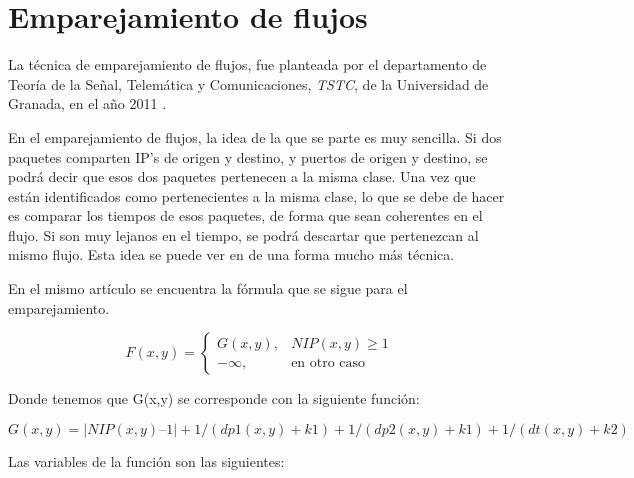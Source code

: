 \section{Emparejamiento de flujos}

La técnica de emparejamiento de flujos, fue planteada por el departamento de Teoría de la Señal, 
Telemática y Comunicaciones, \textit{TSTC}, de la Universidad de Granada, en el año 2011 \cite{presentacion} \cite{comparacion}. 

\intro En el emparejamiento de flujos, la idea de la que se parte es muy sencilla. Si dos paquetes comparten 
IP's de origen y destino, y puertos de origen y destino, se podrá decir que esos dos paquetes pertenecen a 
la misma clase. Una vez que están identificados como pertenecientes a la misma clase, lo que se debe de hacer 
es comparar los tiempos de esos paquetes, de forma que sean coherentes en el flujo. Si son muy lejanos en el 
tiempo, se podrá descartar que pertenezcan al mismo flujo. Esta idea se puede ver en \cite{comparacion} de una 
forma mucho más técnica.

\intro En el mismo artículo \cite{comparacion} se encuentra la fórmula que se sigue para el emparejamiento.

\begin{equation*}
	F(x,y)=
 	\begin{cases}
	  G(x,y), & NIP(x,y) \geq 1 \\
	  -\infty, & \text{en otro caso}
	 \end{cases}
\end{equation*}

\intro Donde tenemos que G(x,y) se corresponde con la siguiente función:

\begin{displaymath}
G(x,y) = |NIP(x,y) – 1| + 1 / (dp1(x,y) + k1) + 1 / (dp2(x,y) + k1) + 1 / (dt(x,y) + k2)
\end{displaymath}

\intro Las variables de la función son las siguientes: 

